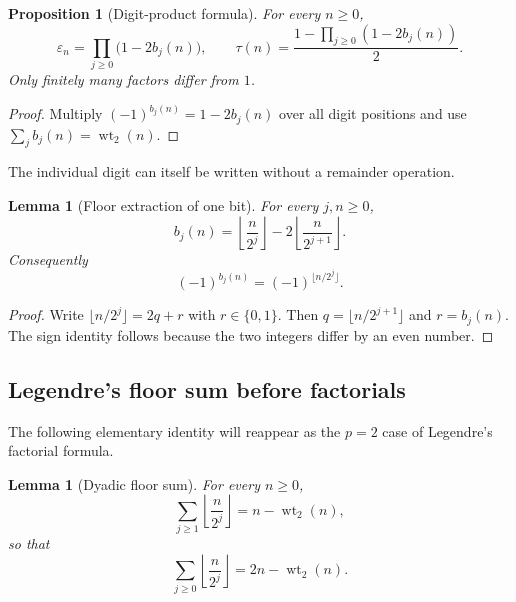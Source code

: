 \documentclass[11pt,oneside]{article}
\newtheorem{proposition}[theorem]{Proposition}
\newtheorem{lemma}[theorem]{Lemma}
\theoremstyle{definition}
\theoremstyle{remark}
\newcommand{\wt}{\operatorname{wt}_2}
\begin{document}
\begin{proposition}[Digit-product formula]
\label{prop:digit-product}
For every $n\ge0$,
\begin{equation}
  \boxed{\displaystyle
  \varepsilon_n=\prod_{j\ge0}\bigl(1-2b_j(n)\bigr),
  \qquad
  \tau(n)=\frac{1-\prod_{j\ge0}(1-2b_j(n))}{2}.}            \label{eq:digit-product}
\end{equation}
Only finitely many factors differ from $1$.
\end{proposition}

\begin{proof}
Multiply $(-1)^{b_j(n)}=1-2b_j(n)$ over all digit positions and use
$\sum_jb_j(n)=\wt(n)$.
\end{proof}

The individual digit can itself be written without a remainder operation.

\begin{lemma}[Floor extraction of one bit]
\label{lem:floor-bit}
For every $j,n\ge0$,
\begin{equation}
  b_j(n)=\left\lfloor\frac{n}{2^j}\right\rfloor
          -2\left\lfloor\frac{n}{2^{j+1}}\right\rfloor.     \label{eq:floor-bit}
\end{equation}
Consequently
\begin{equation}
  (-1)^{b_j(n)}=(-1)^{\lfloor n/2^j\rfloor}.               \label{eq:floor-bit-sign}
\end{equation}
\end{lemma}

\begin{proof}
Write $\lfloor n/2^j\rfloor=2q+r$ with $r\in\{0,1\}$.  Then
$q=\lfloor n/2^{j+1}\rfloor$ and $r=b_j(n)$.  The sign identity follows because
the two integers differ by an even number.
\end{proof}

\subsection{Legendre's floor sum before factorials}

The following elementary identity will reappear as the $p=2$ case of Legendre's
factorial formula.

\begin{lemma}[Dyadic floor sum]
\label{lem:dyadic-floor-sum}
For every $n\ge0$,
\begin{equation}
  \sum_{j\ge1}\left\lfloor\frac{n}{2^j}\right\rfloor
   =n-\wt(n),                                               \label{eq:floor-sum-legendre}
\end{equation}
so that
\begin{equation}
  \sum_{j\ge0}\left\lfloor\frac{n}{2^j}\right\rfloor
   =2n-\wt(n).                                              \label{eq:floor-sum-total}
\end{equation}
\end{lemma}
\end{document}
